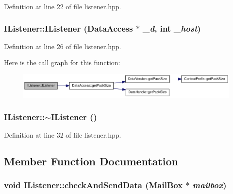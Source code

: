 Definition at line 22 of file listener.hpp.\hypertarget{class_i_listener_a1eba797d318973c361a7d8ce023fb3eb}{
\subsubsection[{IListener}]{\setlength{\rightskip}{0pt plus 5cm}IListener::IListener ({\bf DataAccess} $\ast$ {\em \_\-d}, \/  int {\em \_\-host})}}
\label{class_i_listener_a1eba797d318973c361a7d8ce023fb3eb}


Definition at line 26 of file listener.hpp.

Here is the call graph for this function:\nopagebreak
\begin{figure}[H]
\begin{center}
\leavevmode
\includegraphics[width=326pt]{class_i_listener_a1eba797d318973c361a7d8ce023fb3eb_cgraph}
\end{center}
\end{figure}
\hypertarget{class_i_listener_a9c66b3735fe70263e9717f50ac00cff9}{
\subsubsection[{$\sim$IListener}]{\setlength{\rightskip}{0pt plus 5cm}IListener::$\sim$IListener ()}}
\label{class_i_listener_a9c66b3735fe70263e9717f50ac00cff9}


Definition at line 32 of file listener.hpp.

\subsection{Member Function Documentation}
\hypertarget{class_i_listener_a092fa85ce870bd169930cffce12bc87b}{
\subsubsection[{checkAndSendData}]{\setlength{\rightskip}{0pt plus 5cm}void IListener::checkAndSendData ({\bf MailBox} $\ast$ {\em mailbox})}}
\label{class_i_listener_a092fa85ce870bd169930cffce12bc87b}


